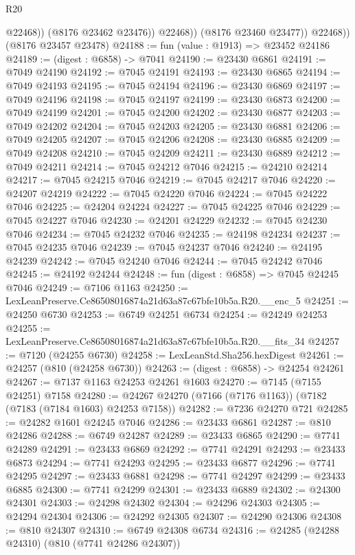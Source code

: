 \begin{lexlean}{R20}
\begin{coremodule}
{                    @22468))
                (@8176 @23462 @23476))
              @22468))
          (@8176 @23460 @23477))
        @22468))
    (@8176 @23457 @23478)
@24188 := fun (value : @1913) => @23452 @24186
@24189 := (digest : @6858) -> @7041
@24190 := @23430 @6861
@24191 := @7049 @24190
@24192 := @7045 @24191
@24193 := @23430 @6865
@24194 := @7049 @24193
@24195 := @7045 @24194
@24196 := @23430 @6869
@24197 := @7049 @24196
@24198 := @7045 @24197
@24199 := @23430 @6873
@24200 := @7049 @24199
@24201 := @7045 @24200
@24202 := @23430 @6877
@24203 := @7049 @24202
@24204 := @7045 @24203
@24205 := @23430 @6881
@24206 := @7049 @24205
@24207 := @7045 @24206
@24208 := @23430 @6885
@24209 := @7049 @24208
@24210 := @7045 @24209
@24211 := @23430 @6889
@24212 := @7049 @24211
@24214 := @7045 @24212 @7046
@24215 := @24210 @24214
@24217 := @7045 @24215 @7046
@24219 := @7045 @24217 @7046
@24220 := @24207 @24219
@24222 := @7045 @24220 @7046
@24224 := @7045 @24222 @7046
@24225 := @24204 @24224
@24227 := @7045 @24225 @7046
@24229 := @7045 @24227 @7046
@24230 := @24201 @24229
@24232 := @7045 @24230 @7046
@24234 := @7045 @24232 @7046
@24235 := @24198 @24234
@24237 := @7045 @24235 @7046
@24239 := @7045 @24237 @7046
@24240 := @24195 @24239
@24242 := @7045 @24240 @7046
@24244 := @7045 @24242 @7046
@24245 := @24192 @24244
@24248 := fun (digest : @6858) => @7045 @24245 @7046
@24249 := @7106 @1163
@24250 := LexLeanPreserve.Ce86508016874a21d63a87c67bfe10b5a.R20.__enc_5
@24251 := @24250 @6730
@24253 := @6749 @24251 @6734
@24254 := @24249 @24253
@24255 := LexLeanPreserve.Ce86508016874a21d63a87c67bfe10b5a.R20.__fits_34
@24257 := @7120 (@24255 @6730)
@24258 := LexLeanStd.Sha256.hexDigest
@24261 := @24257 (@810 (@24258 @6730))
@24263 := (digest : @6858) -> @24254 @24261
@24267 := @7137 @1163 @24253 @24261 @1603
@24270 := @7145 (@7155 @24251) @7158
@24280 := @24267 @24270 (@7166 (@7176 @1163)) (@7182 (@7183 (@7184 @1603) @24253 @7158))
@24282 := @7236 @24270 @721
@24285 := @24282 @1601 @24245 @7046
@24286 := @23433 @6861
@24287 := @810 @24286
@24288 := @6749 @24287
@24289 := @23433 @6865
@24290 := @7741 @24289
@24291 := @23433 @6869
@24292 := @7741 @24291
@24293 := @23433 @6873
@24294 := @7741 @24293
@24295 := @23433 @6877
@24296 := @7741 @24295
@24297 := @23433 @6881
@24298 := @7741 @24297
@24299 := @23433 @6885
@24300 := @7741 @24299
@24301 := @23433 @6889
@24302 := @24300 @24301
@24303 := @24298 @24302
@24304 := @24296 @24303
@24305 := @24294 @24304
@24306 := @24292 @24305
@24307 := @24290 @24306
@24308 := @810 @24307
@24310 := @6749 @24308 @6734
@24316 := @24285 (@24288 @24310) (@810 (@7741 @24286 @24307))
}
\end{coremodule}
\end{lexlean}
